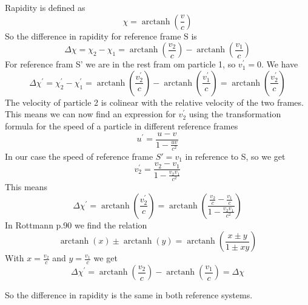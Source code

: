 \documentclass[11pt,a4paper]{report}
\DeclareMathOperator\arctanh{arctanh}
\newcounter{excount}[chapter]
\newenvironment{exercise}[1][]{\addtocounter{excount}{1} \noindent {\bf Question
    \arabic{excount} \ \ #1}\hspace{2mm}}{\vspace{4mm}}
\begin{document}
\begin{exercise}{\bf Relativistics\\}
Rapidity is defined as 
\begin{equation}
\chi = \arctanh (\frac{v}{c})
\end{equation}
So the difference in rapidity for reference frame S is 
\begin{equation}
\Delta \chi = \chi_2 - \chi_1 = \arctanh (\frac{v_2}{c}) - \arctanh (\frac{v_1}{c})
\end{equation}
For reference fram S' we are in the rest fram om particle 1, so $v_1^{\prime} = 0 $. We have
\begin{equation}
\Delta \chi^{\prime} = \chi_2^{\prime} - \chi_1^{\prime} = \arctanh (\frac{v_2^{\prime}}{c}) - \arctanh (\frac{v_1^{\prime}}{c}) = \arctanh (\frac{v_2^{\prime}}{c})
\end{equation}
The velocity of particle 2 is colinear with the relative velocity of the two frames. This means we can now find an expression for $v_2^{\prime}$ using the transformation formula for the speed of a particle in different reference frames\\
\begin{equation}
u^{\prime} = \frac{u - v}{1 - \frac{uv}{c^2}}
\end{equation}
In our case the speed of reference frame $S' = v_1$ in reference to S, so we get
\begin{equation}
v_2^{\prime} = \frac{v_2 - v_1}{1 - \frac{v_2 v_1}{c^2}}
\end{equation}
This means
\begin{equation}
\Delta \chi^{\prime} = \arctanh (\frac{v_2^{\prime}}{c}) = \arctanh \left (\frac{\frac{v_2}{c} - \frac{v_1}{c}}{1 - \frac{v_2 v_1}{c^2}}\right )
\end{equation}
In Rottmann p.90 we find the relation
\begin{equation}
\arctanh (x) \pm \arctanh (y) = \arctanh \left (\frac{x \pm y}{1 \pm xy}\right)
\end{equation}
With $x = \frac{v_2}{c}$ and $y = \frac{v_1}{c}$ we get
\begin{equation}
\Delta \chi^{\prime} = \arctanh (\frac{v_2}{c}) - \arctanh (\frac{v_1}{c}) = \Delta \chi
\end{equation}
\end{exercise}

So the difference in rapidity is the same in both reference systems.\\
\end{document}

